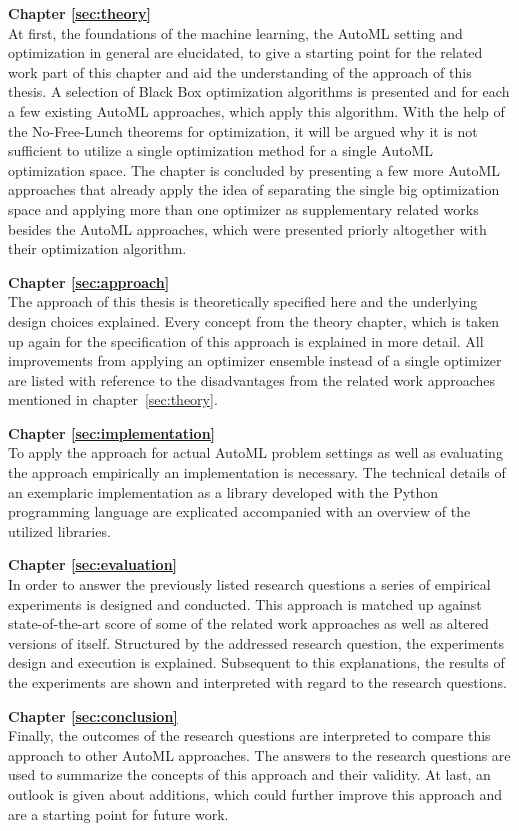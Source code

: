 \textbf{Chapter \ref{sec:theory}} \\[0.2em]
At first, the foundations of the machine learning, the AutoML setting and optimization in general are elucidated, to give a starting point for the related work part of this chapter and aid the understanding of the approach of this thesis.
A selection of Black Box optimization algorithms is presented and for each a few existing AutoML approaches, which apply this algorithm.
With the help of the No-Free-Lunch theorems for optimization, it will be argued why it is not sufficient to utilize a single optimization method for a single AutoML optimization space.
The chapter is concluded by presenting a few more AutoML approaches that already apply the idea of separating the single big optimization space and applying more than one optimizer as supplementary related works besides the AutoML approaches, which were presented priorly altogether with their optimization algorithm.

\textbf{Chapter \ref{sec:approach}} \\[0.2em]
The approach of this thesis is theoretically specified here and the underlying design choices explained.
Every concept from the theory chapter, which is taken up again for the specification of this approach is explained in more detail.
All improvements from applying an optimizer ensemble instead of a single optimizer are listed with reference to the disadvantages from the related work approaches mentioned in chapter~\ref{sec:theory}.

\textbf{Chapter \ref{sec:implementation}} \\[0.2em]
To apply the approach for actual AutoML problem settings as well as evaluating the approach empirically an implementation is necessary.
The technical details of an exemplaric implementation as a library developed with the Python programming language are explicated accompanied with an overview of the utilized libraries.

\textbf{Chapter \ref{sec:evaluation}} \\[0.2em]
In order to answer the previously listed research questions a series of empirical experiments is designed and conducted.
This approach is matched up against state-of-the-art score of some of the related work approaches as well as altered versions of itself.
Structured by the addressed research question, the experiments design and execution is explained.
Subsequent to this explanations, the results of the experiments are shown and interpreted with regard to the research questions.

\textbf{Chapter \ref{sec:conclusion}} \\[0.2em]
Finally, the outcomes of the research questions are interpreted to compare this approach to other AutoML approaches.
The answers to the research questions are used to summarize the concepts of this approach and their validity.
At last, an outlook is given about additions, which could further improve this approach and are a starting point for future work.
